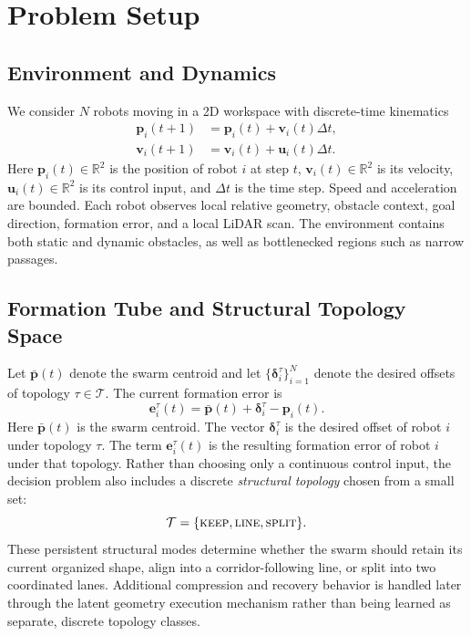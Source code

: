 \documentclass{ieeeaccess}
\newcommand{\R}{\mathbb{R}}
\newcommand{\cT}{\mathcal{T}}
\newcommand{\bfu}{\mathbf{u}}
\newcommand{\bfp}{\mathbf{p}}
\newcommand{\bfv}{\mathbf{v}}
\newcommand{\bfe}{\mathbf{e}}
\begin{document}
\section{Problem Setup}
\label{sec:problem}

\subsection{Environment and Dynamics}
We consider $N$ robots moving in a 2D workspace with discrete-time kinematics
\begin{equation}
\begin{aligned}
\bfp_i(t+1) &= \bfp_i(t) + \bfv_i(t)\Delta t,\\
\bfv_i(t+1) &= \bfv_i(t) + \bfu_i(t)\Delta t.
\end{aligned}
\label{eq:dynamics}
\end{equation}
Here $\bfp_i(t)\in\R^2$ is the position of robot $i$ at step $t$,
$\bfv_i(t)\in\R^2$ is its velocity, $\bfu_i(t)\in\R^2$ is its control
input, and $\Delta t$ is the time step. Speed and acceleration are
bounded. Each robot observes local relative geometry, obstacle context,
goal direction, formation error, and a local LiDAR scan. The
environment contains both static and dynamic obstacles, as well as
bottlenecked regions such as narrow passages.

\subsection{Formation Tube and Structural Topology Space}
Let $\bar{\bfp}(t)$ denote the swarm centroid and let $\{\bm{\delta}_i^\tau\}_{i=1}^N$ denote the desired offsets of topology $\tau \in \cT$. The current formation error is
\begin{equation}
\bfe_i^\tau(t) = \bar{\bfp}(t) + \bm{\delta}_i^\tau - \bfp_i(t).
\end{equation}
Here $\bar{\bfp}(t)$ is the swarm centroid. The vector
$\bm{\delta}_i^\tau$ is the desired offset of robot $i$ under topology
$\tau$. The term $\bfe_i^\tau(t)$ is the resulting formation error of
robot $i$ under that topology.
Rather than choosing only a continuous control input, the decision problem also includes a discrete \emph{structural topology} chosen from a small set:
\begin{equation}
\cT=\{\textsc{keep},\textsc{line},\textsc{split}\}.
\end{equation}
These persistent structural modes determine whether the swarm should retain its current organized shape, align into a corridor-following line, or split into two coordinated lanes. Additional compression and recovery behavior is handled later through the latent geometry execution mechanism rather than being learned as separate, discrete topology classes.
\end{document}

